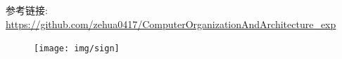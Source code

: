 \documentclass[AutoFakeBold]{LZUThesis}
\begin{document}
\backmatter





\Appendix
参考链接:
\url{https://github.com/zehua0417/ComputerOrganizationAndArchitecture_exp}
\begin{figure}[htbp]
    \centering
    \texttt{[image: img/sign]}
\end{figure}



\end{document}
